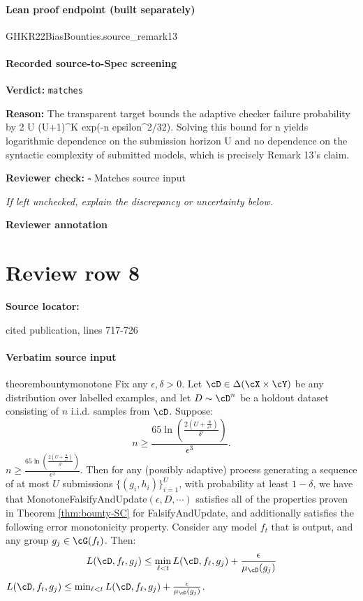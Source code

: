 \documentclass[10pt]{article}
\newcommand{\reviewerbox}{%
  \par\noindent\fbox{\parbox{0.96\linewidth}{\rule{0pt}{0.38in}}}\par
}
\newcommand{\reviewmatch}[1]{%
  \par\noindent\textbf{Reviewer check:} $\square$\; #1\par
  \noindent\emph{If left unchecked, explain the discrepancy or uncertainty below.}\par
}
\begin{document}
\paragraph{Lean proof endpoint (built separately)}\begin{ReviewVerbatim}
GHKR22BiasBounties.source_remark13
\end{ReviewVerbatim}

\paragraph{Recorded source-to-Spec screening}
\textbf{Verdict:} \texttt{matches}
\\
{\raggedright
\textbf{Reason:} The transparent target bounds the adaptive checker failure probability by 2 U (U+1)\textasciicircum{}K exp(-\allowbreak{}n epsilon\textasciicircum{}2/\allowbreak{}32).\allowbreak{} Solving this bound for n yields logarithmic dependence on the submission horizon U and no dependence on the syntactic complexity of submitted models, which is precisely Remark 13's claim.\allowbreak{}
\par}
\reviewmatch{Matches source input}
\noindent\textbf{Reviewer annotation}\par
\reviewerbox
\clearpage
\hypertarget{source-claim-e366ac8dda0f0464}{}
\section*{Review row 8}
\textbf{Source locator:} {\footnotesize\raggedright cited publication, lines 717-\allowbreak{}726\par}
\paragraph{Verbatim source input}
\begin{ReviewVerbatim}
\begin{restatable}{theorem}{bountymonotone}
\label{thm:bounty-monotone-SC}
Fix any $\epsilon,\delta > 0$. Let $\cD \in \Delta(\cX \times \cY)$ be any distribution over labelled examples, and let $D \sim \cD^n$ be a holdout dataset consisting of $n$ i.i.d. samples from $\cD$. Suppose: \ifdraft
$$n \geq \frac{65 \ln\left(\frac{2(U+\frac{8}{\epsilon^3})}{\delta'}\right)}{\epsilon^3}.$$
\else $n \geq \frac{65 \ln\left(\frac{2(U+\frac{8}{\epsilon^3})}{\delta'}\right)}{\epsilon^3}.$\fi
Then for any (possibly adaptive) process generating a sequence of at most $U$ submissions $\{(g_i,h_i)\}_{i=1}^U$, with probability at least $1-\delta$, we have that MonotoneFalsifyAndUpdate$(\epsilon,D,\cdots)$ satisfies all of the properties proven in Theorem \ref{thm:bounty-SC} for FalsifyAndUpdate, and additionally satisfies the following error monotonicity property. Consider any model $f_t$ that is output, and any group $g_j \in \cG(f_t)$. Then:
\ifdraft
$$L(\cD,f_t,g_j) \leq \min_{\ell < t} L(\cD, f_{\ell}, g_j) + \frac{\epsilon}{\mu_\cD(g_j)} $$
\else $L(\cD,f_t,g_j) \leq \min_{\ell < t} L(\cD, f_{\ell}, g_j) + \frac{\epsilon}{\mu_\cD(g_j)}$. \fi
\end{restatable}
\end{ReviewVerbatim}
\end{document}
